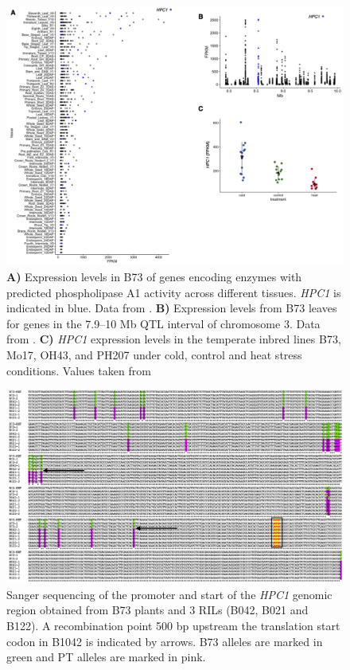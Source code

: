 \documentclass[9pt,twocolumn,twoside,lineno]{biorxiv}
\begin{document}
\begin{figure}[t]
\begin{center}
\includegraphics[width=0.8\paperwidth]{Sup_Figures/Sup_Fig_5.png}
\caption{\textbf{A)} Expression levels in B73 of genes encoding enzymes with predicted phospholipase A1 activity across different tissues. \textit{HPC1} is indicated in blue. 
Data from \cite{Stelpflug2016-vr}.
\textbf{B)} Expression levels from B73 leaves for genes in the 7.9--10 Mb QTL interval of chromosome 3. 
Data from \cite{Stelpflug2016-vr}.
\textbf{C)} \textit{HPC1} expression levels in the temperate inbred lines B73, Mo17, OH43, and PH207 under cold, control and heat stress conditions. Values taken from \cite{Waters2017-nat}
} 
\label{SupFig5}
\end{center}
\end{figure} 

\clearpage

\begin{figure}[t]
\begin{center}
\includegraphics[width=0.9\paperwidth]{Sup_Figures/Sup_Fig_6.png}
\caption{Sanger sequencing of the promoter and start of the \textit{HPC1} genomic region obtained from B73 plants and 3 RILs (B042, B021 and B122). A recombination point 500 bp upstream the translation start codon in B1042 is indicated by arrows. B73 alleles are marked in green and PT alleles are marked in pink. 
}
\label{SupFig6}
\end{center}
\end{figure} 
\end{document}

